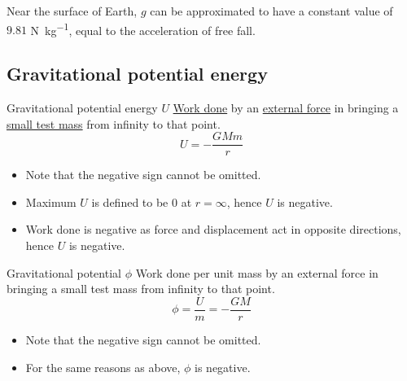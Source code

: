 Near the surface of Earth, $g$ can be approximated to have a constant value of $\mathbf{9.81}$ \unit{N.kg^{-1}}, equal to the acceleration of free fall.
\pagebreak

\subsection{Gravitational potential energy}
\begin{defn}{Gravitational potential energy $U$}{}
\underline{Work done} by an \underline{external force} in bringing a \underline{small test mass} from infinity to that point.
\begin{equation} U = -\frac{GMm}{r} \end{equation}
\end{defn}

\begin{itemize}
\item Note that the negative sign cannot be omitted.
\item Maximum $U$ is defined to be 0 at $r=\infty$, hence $U$ is negative.
\item Work done is negative as force and displacement act in opposite directions, hence $U$ is negative.
\end{itemize}

\begin{defn}{Gravitational potential $\phi$}{}
Work done per unit mass by an external force in bringing a small test mass from infinity to that point.
\begin{equation} \phi = \frac{U}{m} = -\frac{GM}{r} \end{equation}
\end{defn}

\begin{itemize}
\item Note that the negative sign cannot be omitted.
\item For the same reasons as above, $\phi$ is negative.
\end{itemize}
\pagebreak

